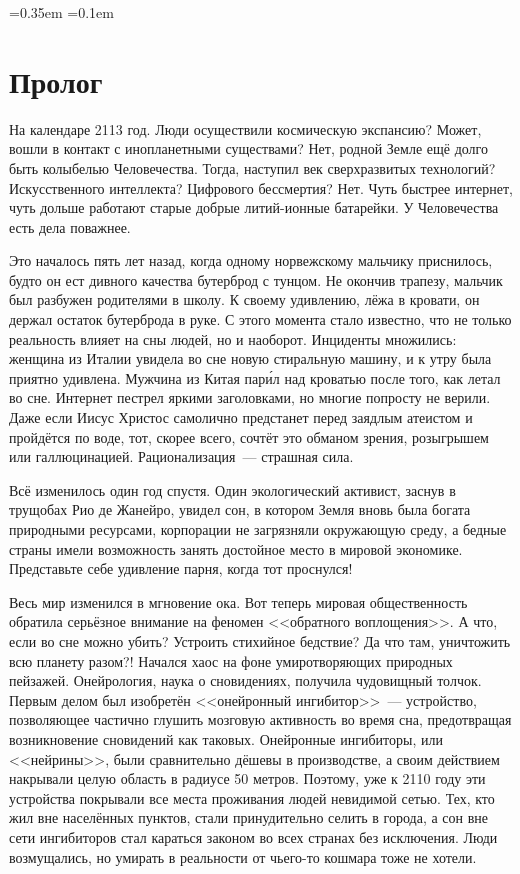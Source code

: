 \documentclass[openany, oneside]{book}
\begin{document}
\font=0.35em
\font=0.1em

\chapter*{Пролог}
На календаре 2113 год. Люди осуществили космическую экспансию? Может, вошли в контакт с инопланетными существами? Нет, родной Земле ещё долго быть колыбелью Человечества. Тогда, наступил век сверхразвитых технологий? Искусственного интеллекта? Цифрового бессмертия? Нет. Чуть быстрее интернет, чуть дольше работают старые добрые литий-ионные батарейки. У Человечества есть дела поважнее.

Это началось пять лет назад, когда одному норвежскому мальчику приснилось, будто он ест дивного качества бутерброд с тунцом. Не окончив трапезу, мальчик был разбужен родителями в школу. К своему удивлению, лёжа в кровати, он держал остаток бутерброда в руке. С этого момента стало известно, что не только реальность влияет на сны людей, но и наоборот. Инциденты множились: женщина из Италии увидела во сне новую стиральную машину, и к утру была приятно удивлена. Мужчина из Китая пар\'{и}л над кроватью после того, как летал во сне. Интернет пестрел яркими заголовками, но многие попросту не верили. Даже если Иисус Христос самолично предстанет перед заядлым атеистом и пройдётся по воде, тот, скорее всего, сочтёт это обманом зрения, розыгрышем или галлюцинацией. Рационализация~--- страшная сила.

Всё изменилось один год спустя. Один экологический активист, заснув в трущобах Рио де Жанейро, увидел сон, в котором Земля вновь была богата природными ресурсами, корпорации не загрязняли окружающую среду, а бедные страны имели возможность занять достойное место в мировой экономике. Представьте себе удивление парня, когда тот проснулся!

Весь мир изменился в мгновение ока. Вот теперь мировая общественность обратила серьёзное внимание на феномен <<обратного воплощения>>. А что, если во сне можно убить? Устроить стихийное бедствие? Да что там, уничтожить всю планету разом?! Начался хаос на фоне умиротворяющих природных пейзажей. Онейрология, наука о сновидениях, получила чудовищный толчок. Первым делом был изобретён <<онейронный ингибитор>>~--- устройство, позволяющее частично глушить мозговую активность во время сна, предотвращая возникновение сновидений как таковых. Онейронные ингибиторы, или <<нейрины>>, были сравнительно дёшевы в производстве, а своим действием накрывали целую область в радиусе 50 метров. Поэтому, уже к 2110 году эти устройства покрывали все места проживания людей невидимой сетью. Тех, кто жил вне населённых пунктов, стали принудительно селить в города, а сон вне сети ингибиторов стал караться законом во всех странах без исключения. Люди возмущались, но умирать в реальности от чьего-то кошмара тоже не хотели.
\end{document}
